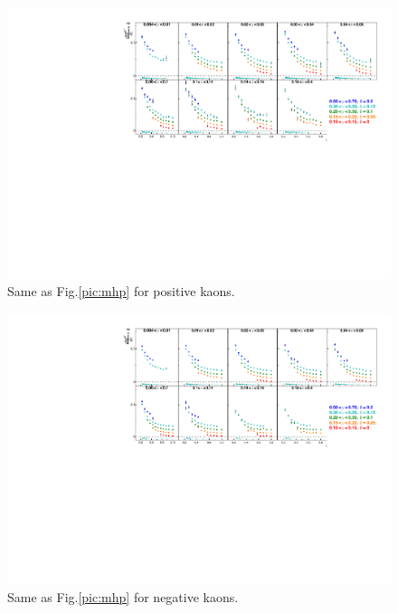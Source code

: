 \begin{figure}[!h]
  \centering
	\includegraphics[scale=0.85]{./gfx/Kp.pdf}
	\caption{Same as Fig.\ref{pic:mhp} for positive kaons.}
	\label{pic:mkp}
\end{figure}
\vfill

\newpage
\null
\vfill
\begin{figure}[!h]
  \centering
	\includegraphics[scale=0.85]{./gfx/Km.pdf}
	\caption{Same as Fig.\ref{pic:mhp} for negative kaons.}
	\label{pic:mkm}
\end{figure}

